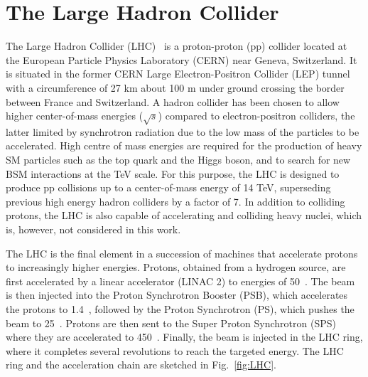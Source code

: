 
\section{The Large Hadron Collider}
\label{sec:LHC}


The Large Hadron Collider (LHC)~\cite{1748-0221-3-08-S08001} is a proton-proton (pp) collider located at the European Particle Physics Laboratory (CERN) near Geneva, Switzerland. It is situated in the former CERN Large Electron-Positron Collider (LEP) tunnel with a circumference of 27 km about 100 m under ground crossing the border between France and Switzerland. A hadron collider has been chosen to allow higher center-of-mass energies ($\sqrt{s}$) compared to electron-positron colliders, the latter limited by synchrotron radiation due to the low mass of the particles to be accelerated. High centre of mass energies are required for the production of heavy SM particles such as the top quark and the Higgs boson, and to search for new BSM interactions at the TeV scale.
For this purpose, the LHC is designed to produce pp collisions up to a center-of-mass energy of 14 TeV, superseding previous high energy hadron colliders by a factor of 7. In addition to colliding protons, the LHC is also capable of accelerating and colliding heavy nuclei, which is, however, not considered in this work.

The LHC is the final element in a succession of machines that accelerate protons to increasingly higher energies. 
Protons, obtained from a hydrogen source, are first accelerated by a linear accelerator (LINAC 2) to energies of 50~\MeV.
The beam is then injected into the Proton Synchrotron Booster (PSB), which accelerates the protons to 1.4~\GeV, followed by the Proton Synchrotron (PS), which pushes the beam to 25~\GeV. Protons are then sent to the Super Proton Synchrotron (SPS) where they are accelerated to 450~\GeV.
Finally, the beam is injected in the LHC ring, where it completes several revolutions to reach the targeted energy. The LHC ring and the acceleration chain are sketched in Fig.~\ref{fig:LHC}.

